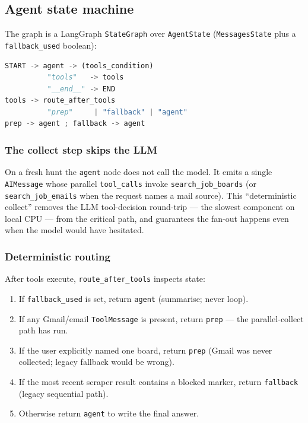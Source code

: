 \documentclass[11pt,a4paper]{article}
\newcommand{\code}[1]{\texttt{#1}}
\begin{document}
\subsection{Agent state machine}
\label{sec:orchestration}

The graph is a LangGraph \code{StateGraph} over \code{AgentState}
(\code{MessagesState} plus a \code{fallback\_used} boolean):

\begin{lstlisting}[language=Python]
START -> agent -> (tools_condition)
          "tools"   -> tools
          "__end__" -> END
tools -> route_after_tools
          "prep"     | "fallback" | "agent"
prep -> agent ; fallback -> agent
\end{lstlisting}

\subsubsection{The collect step skips the LLM}
On a fresh hunt the \code{agent} node does not call the model. It emits a
single \code{AIMessage} whose parallel \code{tool\_calls} invoke
\code{search\_job\_boards} (or \code{search\_job\_emails} when the request
names a mail source). This ``deterministic collect'' removes the LLM
tool-decision round-trip --- the slowest component on local CPU --- from the
critical path, and guarantees the fan-out happens even when the model would
have hesitated.

\subsubsection{Deterministic routing}
After tools execute, \code{route\_after\_tools} inspects state:

\begin{enumerate}[leftmargin=2.2em]
  \item If \code{fallback\_used} is set, return \code{agent}
        (summarise; never loop).
  \item If any Gmail/email \code{ToolMessage} is present, return
        \code{prep} --- the parallel-collect path has run.
  \item If the user explicitly named one board, return \code{prep}
        (Gmail was never collected; legacy fallback would be wrong).
  \item If the most recent scraper result contains a blocked marker, return
        \code{fallback} (legacy sequential path).
  \item Otherwise return \code{agent} to write the final answer.
\end{enumerate}
\end{document}
